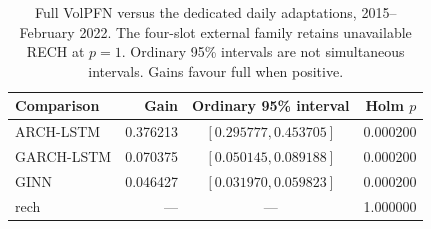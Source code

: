 \begin{table}[!htbp]\centering
\begingroup\small\setlength{\tabcolsep}{4pt}
\caption[Gains against daily financial neural predictors]{Full VolPFN versus the dedicated daily adaptations, 2015--February 2022. The four-slot external family retains unavailable RECH at $p=1$. Ordinary 95\% intervals are not simultaneous intervals. Gains favour full when positive.}\label{tab:new-daily-gains}
\begin{tabular}{@{}>{\raggedright\arraybackslash}p{4.1cm}rcr@{}}
\toprule
Comparison & Gain & Ordinary 95\% interval & Holm $p$ \\
\midrule
ARCH-LSTM & 0.376213 & $[0.295777,0.453705]$ & 0.000200 \\
GARCH-LSTM & 0.070375 & $[0.050145,0.089188]$ & 0.000200 \\
GINN & 0.046427 & $[0.031970,0.059823]$ & 0.000200 \\
rech & --- & --- & 1.000000 \\
\bottomrule
\end{tabular}\endgroup\end{table}
